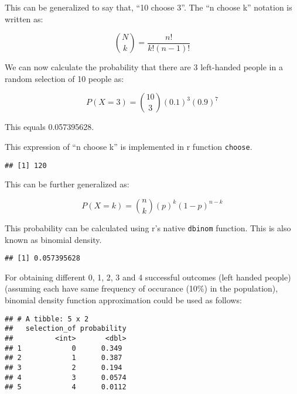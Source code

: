\documentclass[ignorenonframetext,aspectratio=169]{beamer}
\begin{document}
\begin{frame}[fragile]{}
\protect\hypertarget{section-6}{}

This can be generalized to say that, ``10 choose 3''. The ``n choose k''
notation is written as:

\[
\binom{N}{k} = \frac{n!}{k!(n-1)!}
\]

We can now calculate the probability that there are 3 left-handed people
in a random selection of 10 people as:

\[
P(X = 3) = \binom{10}{3}(0.1)^3(0.9)^7
\]

This equals 0.057395628.

This expression of ``n choose k'' is implemented in r function
\texttt{choose}.

\begin{verbatim}
## [1] 120
\end{verbatim}

\end{frame}

\begin{frame}[fragile]{}
\protect\hypertarget{section-7}{}

This can be further generalized as:

\[
P(X = k) = \binom{n}{k} (p)^k(1-p)^{n-k}
\]

This probability can be calculated using r's native \texttt{dbinom}
function. This is also known as binomial density.

\begin{verbatim}
## [1] 0.057395628
\end{verbatim}

\end{frame}

\begin{frame}[fragile]{}
\protect\hypertarget{section-8}{}

For obtaining different 0, 1, 2, 3 and 4 successful outcomes (left
handed people) (assuming each have same frequency of occurance (10\%) in
the population), binomial density function approximation could be used
as follows:

\begin{verbatim}
## # A tibble: 5 x 2
##   selection_of probability
##          <int>       <dbl>
## 1            0      0.349 
## 2            1      0.387 
## 3            2      0.194 
## 4            3      0.0574
## 5            4      0.0112
\end{verbatim}

\end{frame}
\end{document}

